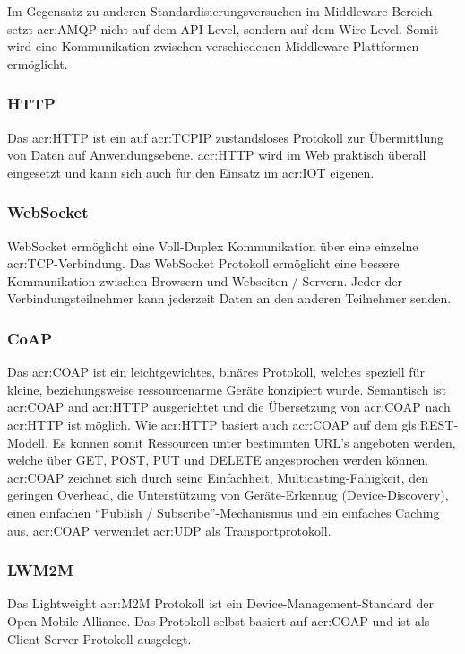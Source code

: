 Im Gegensatz zu anderen Standardisierungsversuchen im Middleware-Bereich setzt \gls{acr:AMQP} nicht auf dem API-Level, sondern auf dem Wire-Level. Somit wird eine Kommunikation zwischen verschiedenen Middleware-Plattformen ermöglicht.



\subsubsection{HTTP}
Das \gls{acr:HTTP} ist ein auf \gls{acr:TCPIP} zustandsloses Protokoll zur Übermittlung von Daten auf Anwendungsebene. \gls{acr:HTTP} wird im Web praktisch überall eingesetzt und kann sich auch für den Einsatz im \gls{acr:IOT} eigenen.



\subsubsection{WebSocket}
WebSocket ermöglicht eine Voll-Duplex Kommunikation über eine einzelne \gls{acr:TCP}-Verbindung. Das WebSocket Protokoll ermöglicht eine bessere Kommunikation zwischen Browsern und Webseiten / Servern. Jeder der Verbindungsteilnehmer kann jederzeit Daten an den anderen Teilnehmer senden.



\subsubsection{CoAP}
Das \gls{acr:COAP} ist ein leichtgewichtes, binäres Protokoll, welches speziell für kleine, beziehungsweise ressourcenarme  Geräte konzipiert wurde. Semantisch ist \gls{acr:COAP} and \gls{acr:HTTP} ausgerichtet und die Übersetzung von \gls{acr:COAP} nach \gls{acr:HTTP} ist möglich. Wie \gls{acr:HTTP} basiert auch \gls{acr:COAP} auf dem \gls{gls:REST}-Modell. Es können somit Ressourcen unter bestimmten URL's angeboten werden, welche über GET, POST, PUT und DELETE angesprochen werden können. \gls{acr:COAP} zeichnet sich durch seine Einfachheit, Multicasting-Fähigkeit, den geringen Overhead, die Unterstützung von Geräte-Erkennug (Device-Discovery), einen einfachen "`Publish / Subscribe"'-Mechanismus und ein einfaches Caching aus. \gls{acr:COAP} verwendet \gls{acr:UDP} als Transportprotokoll.


\subsubsection{LWM2M}
Das Lightweight \gls{acr:M2M} Protokoll ist ein Device-Management-Standard der Open Mobile Alliance. Das Protokoll selbst basiert auf \gls{acr:COAP} und ist als Client-Server-Protokoll ausgelegt.



